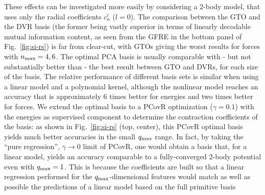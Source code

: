 
These effects can be investigated more easily by considering a 2-body model, that uses only the radial coefficients $c^i_n$ ($l=0$).
The comparison between the GTO and the DVR basis (the former being vastly superior in terms of linearly decodable mutual information content, as seen from the GFRE in the bottom panel of Fig.~\ref{fig:si-rs}) is far from clear-cut, with GTOs giving the worst results for forces with $n_\mathrm{max}=4,6$. 
The optimal PCA basis is usually comparable with - but not substantially better than - the best result between GTO and DVRs, for each size of the basis. 
The relative performance of different basis sets is similar when using a linear model and a polynomial kernel, although the nonlinear model reaches an accuracy that is approximately 6 times better for energies and two times better for forces.  
We extend the optimal basis to a PCovR optimization ($\gamma = 0.1$) with the energies as supervised component to determine the contraction coefficients of the basis: as shown in Fig.~\ref{fig:si-rs} (top, center), this PCovR optimal basis yields much better accuracies in the small $q_\mathrm{max}$ range. 
In fact, by taking the ``pure regression'', $\gamma\rightarrow 0$ limit of PCovR, one would obtain a basis that, for a linear model, yields an accuracy comparable to a fully-converged 2-body potential even with $q_\mathrm{max}=1$. 
This is because the coefficients are built so that a linear regression performed for the $q_\mathrm{max}$-dimensional features would match as well as possible the predictions of a linear model based on the full primitive basis
